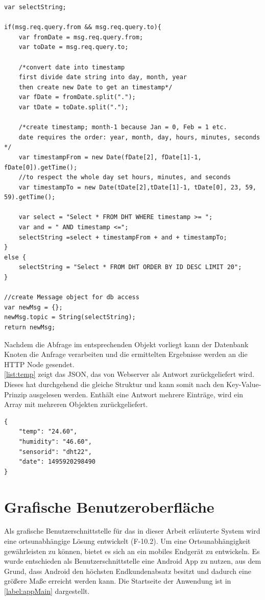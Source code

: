 \begin{lstlisting}[label=list:tempInt, caption={Funktion Node-RED tempInt}]
var selectString;

if(msg.req.query.from && msg.req.query.to){
	var fromDate = msg.req.query.from;
	var toDate = msg.req.query.to;
	
	/*convert date into timestamp
	first divide date string into day, month, year 
	then create new Date to get an timestamp*/
	var fDate = fromDate.split("."); 
	var tDate = toDate.split(".");
	
	/*create timestamp; month-1 because Jan = 0, Feb = 1 etc.
	date requires the order: year, month, day, hours, minutes, seconds */
	var timestampFrom = new Date(fDate[2], fDate[1]-1, fDate[0]).getTime();
	//to respect the whole day set hours, minutes, and seconds
	var timestampTo = new Date(tDate[2],tDate[1]-1, tDate[0], 23, 59, 59).getTime();
	
	var select = "Select * FROM DHT WHERE timestamp >= "; 
	var and = " AND timestamp <=";
	selectString =select + timestampFrom + and + timestampTo;
}
else {
	selectString = "Select * FROM DHT ORDER BY ID DESC LIMIT 20";
}

//create Message object for db access
var newMsg = {};
newMsg.topic = String(selectString);
return newMsg;
\end{lstlisting}

Nachdem die Abfrage im entsprechenden Objekt vorliegt kann der Datenbank Knoten die Anfrage verarbeiten und die ermittelten Ergebnisse werden an die \ac{HTTP} Node gesendet.
\\\autoref{list:temp}  zeigt das \ac{JSON}, das von Webserver als Antwort zurückgeliefert wird. Dieses hat durchgehend die gleiche Struktur und kann somit nach den Key-Value-Prinzip ausgelesen werden. Enthält eine Antwort mehrere Einträge, wird ein Array mit mehreren Objekten zurückgeliefert.
\begin{lstlisting}[label=list:temp, caption={Beispiel: JSON Response für den Pfad: /temp}]
{
	"temp": "24.60",
	"humidity": "46.60",
	"sensorid": "dht22",
	"date": 1495920298490
}
\end{lstlisting}

\section{Grafische Benutzeroberfläche}
Als grafische Benutzerschnittstelle für das in dieser Arbeit erläuterte System wird eine ortsunabhängige Lösung entwickelt (F-10.2). Um eine Ortsunabhängigkeit gewährleisten zu können, bietet es sich an ein mobiles Endgerät zu entwickeln. Es wurde  entschieden als Benutzerschnittstelle eine Android App zu nutzen, aus dem Grund, dass Android den höchsten Endkundenabsatz besitzt \cite{statista:marktanteileandroid} und dadurch eine größere Maße erreicht werden kann. Die Startseite der Anwendung ist in \autoref{label:appMain} dargestellt.
